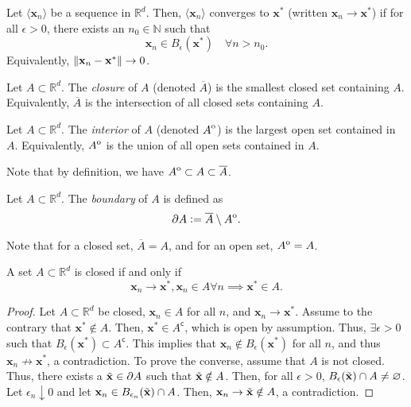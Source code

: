 \begin{defn}
    Let $\langle \mathbf{x}_n \rangle$ be a sequence in $\mathbb{R}^d$. Then, $\langle\mathbf{x}_n\rangle$ converges to $\mathbf{x}^*$ (written $\mathbf{x}_n \to \mathbf{x}^*$) if for all $\epsilon > 0$, there exists an $n_0 \in \mathbb{N}$ such that
    \[
        \mathbf{x}_n \in B_{\epsilon}(\mathbf{x}^*) \quad \forall n > n_0.
    \]
    Equivalently, $\norm{\mathbf{x}_n - \mathbf{x}^*} \to 0$.
\end{defn}

\begin{defn}[Closure]
    Let $A \subset \mathbb{R}^d$. The \emph{closure} of $A$ (denoted $\overline{A}$) is the smallest closed set containing $A$. Equivalently, $\overline{A}$ is the intersection of all closed sets containing $A$.
\end{defn}

\begin{defn}[Interior]
    Let $A \subset \mathbb{R}^d$. The \emph{interior} of $A$ (denoted $\interior{A}$) is the largest open set contained in $A$. Equivalently, $\interior{A}$ is the union of all open sets contained in $A$.
\end{defn}
Note that by definition, we have $\interior{A} \subset A \subset \overline{A}$.

\begin{defn}[Boundary]
    Let $A \subset \mathbb{R}^d$. The \emph{boundary} of $A$ is defined as
    \[
        \partial A \vcentcolon= \overline{A} \setminus \interior{A}.
    \]
\end{defn}
Note that for a closed set, $\overline{A} = A$, and for an open set, $\interior{A} = A$. 

\begin{prop}
    A set $A \subset \mathbb{R}^d$ is closed if and only if
    \[
        \mathbf{x}_n  \to \mathbf{x}^*, \mathbf{x}_n \in A \forall n \implies \mathbf{x}^* \in A.
    \]
\end{prop}
\begin{proof}
    Let $A \subset \mathbb{R}^d$ be closed, $\mathbf{x}_n \in A$ for all $n$, and $\mathbf{x}_n \to \mathbf{x}^*$. Assume to the contrary that $\mathbf{x}^* \notin A$. Then, $\mathbf{x}^* \in A^{\mathsf{c}}$, which is open by assumption. Thus, $\exists \epsilon > 0$ such that $B_{\epsilon}(\mathbf{x}^*) \subset A^{\mathsf{c}}$. This implies that $\mathbf{x}_n \notin B_{\epsilon}(\mathbf{x}^*)$ for all $n$, and thus $\mathbf{x}_n \not\to \mathbf{x}^*$, a contradiction. To prove the converse, assume that $A$ is not closed. Thus, there exists a $\Tilde{\mathbf{x}} \in \partial A$ such that $\Tilde{\mathbf{x}} \notin A$. Then, for all $\epsilon > 0$, $B_{\epsilon}(\Tilde{\mathbf{x}}) \cap A \neq \emptyset$. Let $\epsilon_n \downarrow 0$ and let $\mathbf{x}_n \in B_{\epsilon_n}(\Tilde{\mathbf{x}}) \cap A$. Then, $\mathbf{x}_n \to \Tilde{\mathbf{x}} \notin A$, a contradiction.
\end{proof}

